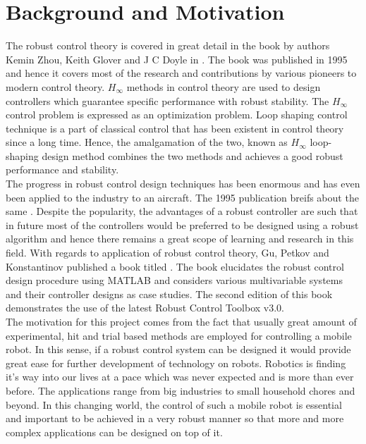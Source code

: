 \documentclass[a4paper,12pt]{article}
\begin{document}
\section{Background and Motivation}
The robust control theory is covered in great detail in the book by authors Kemin Zhou, Keith Glover and J C Doyle in  \cite{book}. The book was published in 1995 and hence it covers most of the research and contributions by various pioneers to modern control theory. $H_{\infty}$ methods in control theory are used to design controllers which guarantee specific performance with robust stability. The $H_{\infty}$ control problem is expressed as an optimization problem. Loop shaping control technique is a part of classical control that has been existent in control theory since a long time. Hence, the amalgamation of the two, known as $H_{\infty}$ loop-shaping design method combines the two methods and achieves a good robust performance and stability. \\
The progress in robust control design techniques has been enormous and has even been applied to the industry to an aircraft. The 1995 publication breifs about the same \cite{aero}. Despite the popularity, the advantages of a robust controller are such that in future most of the controllers would be preferred to be designed using a robust algorithm and hence there remains a great scope of learning and research in this field. With regards to application of robust control theory, Gu, Petkov and Konstantinov published a book titled  \cite{Gu}. The book elucidates the robust control design procedure using MATLAB and considers various multivariable systems and their controller designs as case studies. The second edition of this book demonstrates the use of the latest Robust Control Toolbox v3.0.\\
The motivation for this project comes from the fact that usually great amount of experimental, hit and trial based methods are employed for controlling a mobile robot. In this sense, if a robust control system can be designed it would provide great ease for further development of technology on robots. Robotics is finding it's way into our lives at a pace which was never expected and is more than ever before. The applications range from big industries to small household chores and beyond. In this changing world, the control of such a mobile robot is essential and important to be achieved in a very robust manner so that more and more complex applications can be designed on top of it. \\
\label{bg}
\end{document}
